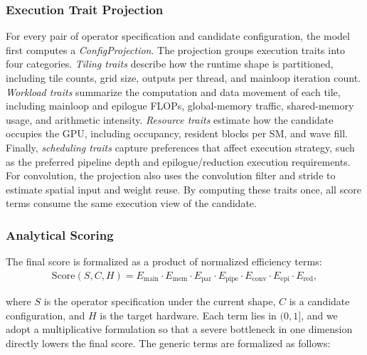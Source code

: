 \subsubsection{Execution Trait Projection}
For every pair of operator specification and candidate configuration, the model
first computes a \textit{ConfigProjection}.  
The projection groups execution traits into four categories.  \emph{Tiling
traits} describe how the runtime shape is partitioned, including tile counts,
grid size, outputs per thread, and mainloop iteration count.  \emph{Workload
traits} summarize the computation and data movement of each tile, including
mainloop and epilogue FLOPs, global-memory traffic, shared-memory usage, and
arithmetic intensity.  \emph{Resource traits} estimate how the candidate
occupies the GPU, including occupancy, resident blocks per SM, and wave fill.
Finally, \emph{scheduling traits} capture preferences that affect execution
strategy, such as the preferred pipeline depth and epilogue/reduction execution
requirements.  For convolution, the projection also uses the convolution filter
and stride to estimate spatial input and weight reuse.  By computing these
traits once, all score terms consume the same execution view of the candidate.


\subsubsection{Analytical Scoring}
The final score is formalized as a product of normalized efficiency terms:
\[
\begin{aligned}
\mathrm{Score}(S,C,H) =
E_{\mathrm{main}} \cdot E_{\mathrm{mem}} \cdot E_{\mathrm{par}}
  \cdot E_{\mathrm{pipe}} 
\cdot E_{\mathrm{conv}} \cdot E_{\mathrm{epi}} \cdot E_{\mathrm{red}},
\end{aligned}
\]

where $S$ is the operator specification under the current shape, $C$ is a
candidate configuration, and $H$ is the target hardware.  Each term lies in
$(0,1]$, and we adopt a multiplicative formulation so that a severe bottleneck 
in one dimension directly lowers the final score.
The generic terms are formalized as follows:

 
